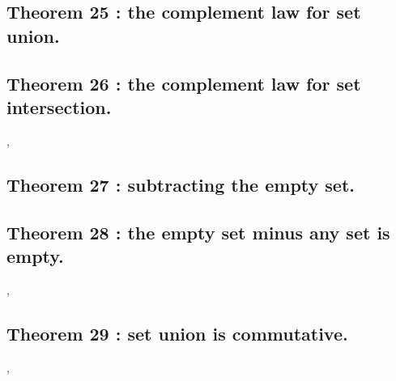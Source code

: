 \documentclass[preview]{standalone}
\begin{document}
\subsection[The complement law for set union.]
    {
        \color{section}Theorem 25 \color{black} : the complement law for set union.
    }

\pagebreak


\subsection[The complement law for set intersection.]
    {
        \color{section}Theorem 26 \color{black} : the complement law for set intersection.
    }

\sep


\subsection[Subtracting the empty set.]
    {
        \color{section}Theorem 27 \color{black} : subtracting the empty set.
    }

\pagebreak


\subsection[The empty set minus any set is empty.]
    {
        \color{section}Theorem 28 \color{black} : the empty set minus any set is empty.
    }

\sep


\subsection[Set union is commutative.]
    {
        \color{section}Theorem 29 \color{black} : set union is commutative.
    }

\sep
\pagebreak


\end{document}
